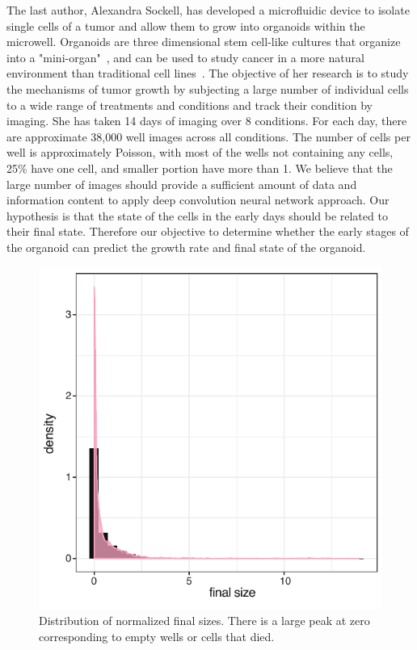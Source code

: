 \documentclass[10pt,twocolumn,letterpaper]{article}
\begin{document}
The last author, Alexandra Sockell, has developed a microfluidic device to isolate single cells of a tumor and allow them to grow into organoids  within the microwell.  Organoids are three dimensional stem cell-like cultures that organize into a "mini-organ"~\cite{rios2018imaging}, and can be used to study cancer in a more natural environment than traditional cell lines~\cite{drost2018organoids}.
The objective of her research is to study the mechanisms of tumor growth by subjecting a large number of  individual cells to a wide range of treatments and conditions and track their condition by imaging.  She has taken 14 days of imaging over 8 conditions.    For each day, there are approximate 38,000 well images across all conditions.  The number of cells per well is approximately Poisson, with most of the wells not containing any cells, 25\% have one cell, and smaller portion have more than 1.  We believe that the large number of images should provide a sufficient amount of data and information content to apply deep convolution neural network approach.  Our hypothesis is that the state of the cells in the early days should be related to their final state.  Therefore our objective to determine whether the early stages of the organoid can predict the growth rate and final state of the organoid.    

\begin{figure}[b!]
\begin{center}
 \includegraphics[width=0.8\linewidth]{figures/final_day_hyst2_area_density.pdf}
\end{center}
   \caption{Distribution of normalized final sizes.  There is a large peak at zero corresponding to empty wells or cells that died.}
\label{final_size_dist}
\end{figure}
\end{document}
